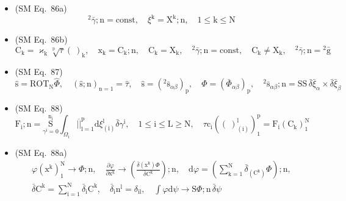 \documentclass[12pt]{article}
\begin{document}
\begin{itemize}[label={},leftmargin=0pt]
    \item (SM Eq.\ 86a) 
    \[
    {}^2\bar{\gamma};\mathrm{n} = \mathrm{const}, \quad \xi^\mathrm{k} = \mathrm{X^k};\mathrm{n}, \quad 1 \le \mathrm{k} \le \mathrm{N}
    \]

    \item (SM Eq.\ 86b) 
    \[
    \mathrm{C_k} = \varkappa_\mathrm{k} \sqrt[\mathrm{p}]{\tau} (\ )_\mathrm{k}, \quad \mathrm{x_k} = \mathrm{C_k};\mathrm{n}, \quad \mathrm{C_k} = \mathrm{X_k}, \quad {}^2\bar{\gamma};\mathrm{n} = \mathrm{const}, \quad \mathrm{C_k} \ne \mathrm{X_k}, \quad {}^2\bar{\gamma};\mathrm{n} = {}^2\bar{\mathrm{g}}
    \]

    \item (SM Eq.\ 87) 
    \[
    \hat{\mathrm{s}} = \mathrm{ROT}_\mathrm{N} \widehat{\Phi}, \quad (\hat{\mathrm{s}};\mathrm{n})_{\mathrm{n=1}} = \hat{\tau}, \quad \hat{\mathrm{s}} = \left({}^2\bar{\mathrm{s}}_{\alpha\beta}\right)_\mathrm{p}, \quad \widehat{\Phi} = \left( \bar{\Phi}_{\alpha\beta} \right)_\mathrm{p}, \quad {}^2\bar{\mathrm{s}}_{\alpha\beta};\mathrm{n} = \mathrm{SS}\,\bar{\delta}\bar{\xi}_\alpha \times \bar{\delta}\bar{\xi}_\beta
    \]

    \item (SM Eq.\ 88) 
    \[
    \mathrm{F_i};\mathrm{n} = \underset{\gamma^\mathrm{i}=0}{\overset{\mathrm{n_i}}{\mathrm{S}}} \int_{\Omega_\mathrm{i}} \overline{||}_{\mathrm{l}=1}^\mathrm{p} \mathrm{d}\xi^\mathrm{l}_{(\mathrm{i})} \bar{\delta}\gamma^\mathrm{i}, \quad 1 \le \mathrm{i} \le \mathrm{L} \ge \mathrm{N}, \quad \tau \mathrm{c_i} \left( (\ )^\mathrm{l}_{(\mathrm{i})} \right)_1^\mathrm{p} = \mathrm{F_i}(\mathrm{C_k})_1^\mathrm{N}
    \]

    \item (SM Eq.\ 88a) 
    \[
    \begin{gathered}
    \varphi(\mathrm{x^k})_1^\mathrm{N} \to \Phi;\mathrm{n}, \quad \frac{\partial\varphi}{\partial \mathrm{x^k}} \to \left( \frac{\bar{\delta}\left(\mathrm{x^k}\right)\Phi}{\bar{\delta}\mathrm{C^k}} \right);\mathrm{n}, \quad \mathrm{d}\varphi = \left( \sum_{\mathrm{k}=1}^\mathrm{N} \bar{\delta}_{(\mathrm{C^k})} \Phi \right);\mathrm{n}, \\
    \bar{\delta}\mathrm{C^k} = \sum_{\mathrm{i}=1}^\mathrm{N} \bar{\delta}_\mathrm{i} \mathrm{C^k}, \quad \bar{\delta}_\mathrm{i} \mathrm{n^l} = \delta_{\mathrm{il}}, \quad \int \varphi \mathrm{d}\psi \to \mathrm{S}\Phi;\mathrm{n}\,\bar{\delta}\psi
    \end{gathered}
    \]


\end{itemize}
\end{document}
